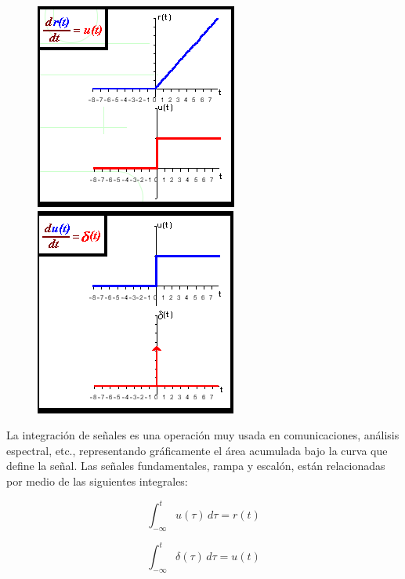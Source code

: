 \documentclass[10pt]{article}
\begin{document}
\begin{figure}[h]
	\includegraphics[scale=0.55]{3}
	\includegraphics[scale=0.55]{4}
	\centering
\end{figure}

La integración de señales es una operación muy usada en comunicaciones, análisis espectral, etc., representando gráficamente el área acumulada bajo la curva que define la señal.
Las señales fundamentales, rampa y escalón,  están relacionadas por medio de las siguientes integrales:

\[
\int_{-\infty}^{t} \! u(\tau)  \,d\tau = r(t)
\]

\[
\int_{-\infty}^{t} \! \delta(\tau)  \,d\tau = u(t)
\]
\end{document}
